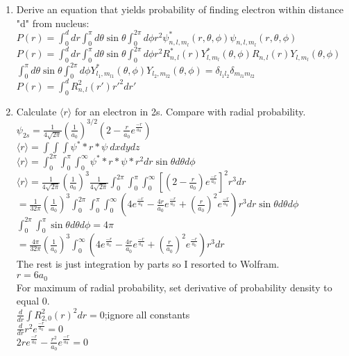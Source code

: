 \documentclass{article}
\begin{document}
\begin{enumerate}
\item Derive an equation that yields probability of finding electron within distance "d" from nucleus:
\\ $P(r)=\int_0^d dr \int_0^\pi d\theta\sin\theta\int_0^{2\pi}d\phi r^2\psi^*_{n,l,m_l}(r,\theta,\phi)\psi_{n,l,m_l} (r,\theta,\phi)$
\\ $P(r)=\int_0^d dr \int_0^\pi d\theta\sin\theta\int_0^{2\pi}d\phi r^2R_{n,l}^*(r)Y^*_{l,m_l}(\theta,\phi) R_{n,l}(r)Y_{l,m_l} (\theta,\phi)$
\\ $\int_0^\pi d\theta\sin\theta\int_0^{2\pi}d\phi Y^*_{l_1,m_{l1}}(\theta,\phi)Y_{l_2,m_{l2}}(\theta,\phi)=\delta_{l_1l_2}\delta_{m_{l1}m_{l2}}$
\\ $P(r)=\int_0^dR^2_{n,l}(r')r'^2dr'$
\item Calculate $\langle r\rangle$ for an electron in 2s. Compare with radial probability.
\\ $\psi_{2s}=\frac{1}{4\sqrt{2\pi}}\left(\frac{1}{a_0}\right)^{3/2}\left(2-\frac{r}{a_0}e^\frac{-r}{a_0}\right)$
\\ $\langle r\rangle = \int\int\int \psi^**r*\psi~dxdydz$
\\ $\langle r\rangle = \int_0^{2\pi}\int_0^\pi\int_0^\infty\psi^**r*\psi*r^2dr\sin\theta d\theta d\phi$ 
\\ $\langle r\rangle =\frac{1}{4\sqrt{2\pi}}\left(\frac{1}{a_0}\right)^3\frac{1}{4\sqrt{2\pi}}\int_0^{2\pi}\int_0^\pi\int_0^\infty[(2-\frac{r}{a_0})e^{\frac{-r}{a_0}}]^2r^3dr$
\\ $= \frac{1}{32\pi}\left(\frac{1}{a_0}\right)^3\int_0^{2\pi}\int_0^\pi\int_0^\infty\left(4e^{\frac{-r}{a_0}}-\frac{4r}{a_0}e^{\frac{-r}{a_0}}+\left(\frac{r}{a_0}\right)^2e^{\frac{-r}{a_0}}\right)r^3dr\sin\theta d\theta d\phi$
\\ $\int_0^{2\pi}\int_0^\pi\sin\theta d\theta d\phi =4\pi$
\\ $= \frac{4\pi}{32\pi}\left(\frac{1}{a_0}\right)^3\int_0^\infty\left(4e^{\frac{-r}{a_0}}-\frac{4r}{a_0}e^{\frac{-r}{a_0}}+\left(\frac{r}{a_0}\right)^2e^{\frac{-r}{a_0}}\right)r^3dr$
\\ The rest is just integration by parts so I resorted to Wolfram.
\\ $r=6a_0$
\\ For maximum of radial probability, set derivative of probability density to equal 0.
\\ $\frac{d}{dr}\int R_{2,0}^2(r)^2dr=0$;ignore all constants
\\ $\frac{d}{dr}r^2e^\frac{-r}{a_0}=0$
\\ $2re^\frac{-r}{a_0}-\frac{r^2}{a_0}e^\frac{-r}{a_0}=0$

\end{enumerate}
\end{document}
